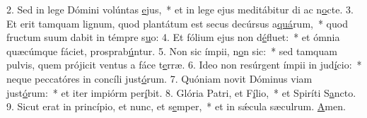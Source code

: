 2. Sed in lege Dómini volúntas \uline{e}jus,~* et in lege ejus meditábitur di ac n\uline{o}cte.
3. Et erit tamquam lignum, quod plantátum est secus decúrsus a\uline{quá}rum,~* quod fructum suum dabit in témpre s\uline{u}o:
4. Et fólium ejus non d\uline{é}fluet:~* et ómnia quæcúmque fáciet, prosprab\uline{ú}ntur.
5. Non sic ímpii, n\uline{o}n sic:~* sed tamquam pulvis, quem prójicit ventus a fáce t\uline{e}rræ.
6. Ideo non resúrgent ímpii in jud\uline{í}cio:~* neque peccatóres in concíli just\uline{ó}rum.
7. Quóniam novit Dóminus viam just\uline{ó}rum:~* et iter impiórm per\uline{í}bit.
8. Glória Patri, et F\uline{í}lio,~* et Spiríti S\uline{a}ncto.
9. Sicut erat in princípio, et nunc, et s\uline{e}mper,~* et in sǽcula sæculrum. \uline{A}men.
